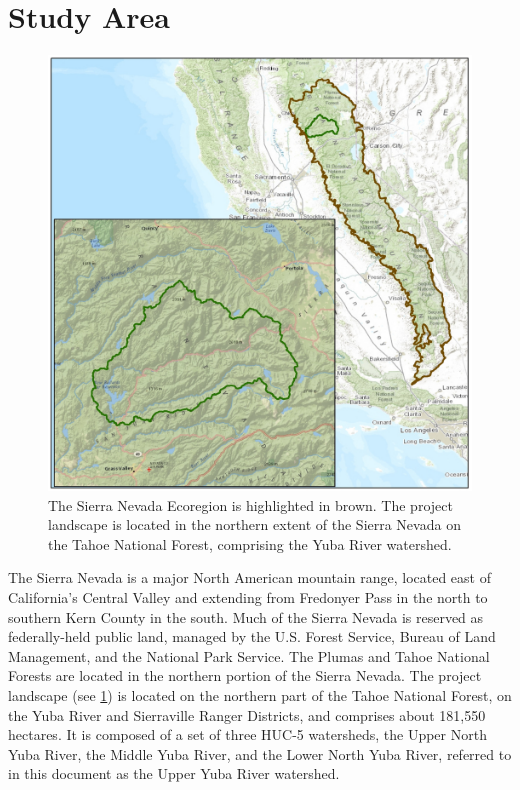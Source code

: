 \section{Study Area}
\begin{figure}
\includegraphics[]{ecoregionprojectarea.jpg}
\caption{The Sierra Nevada Ecoregion is highlighted in brown. The project landscape is located in the northern extent of the Sierra Nevada on the Tahoe National Forest, comprising the Yuba River watershed.}
\label{projectarea}
\end{figure}
The Sierra Nevada is a major North American mountain range, located east of California's Central Valley and extending from Fredonyer Pass in the north to southern Kern County in the south. Much of the Sierra Nevada is reserved as federally-held public land, managed by the U.S. Forest Service, Bureau of Land Management, and the National Park Service. The Plumas and Tahoe National Forests are located in the northern portion of the Sierra Nevada. The project landscape (see \ref{projectarea}) is located on the northern part of the Tahoe National Forest, on the Yuba River and Sierraville Ranger Districts, and comprises about 181,550 hectares. It is composed of a set of three HUC-5 watersheds, the Upper North Yuba River, the Middle Yuba River, and the Lower North Yuba River, referred to in this document as the Upper Yuba River watershed. 

